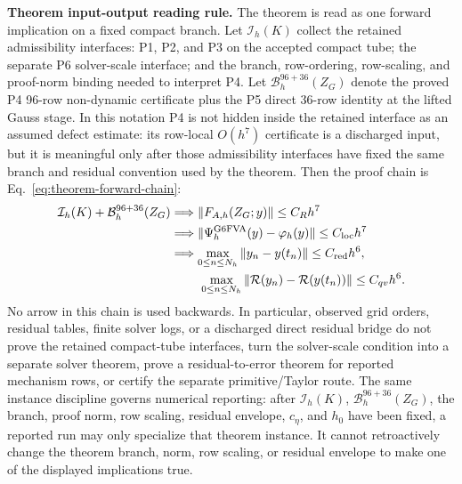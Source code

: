 \documentclass[preprint,12pt]{elsarticle}
\begin{document}
\noindent\textbf{Theorem input-output reading rule.}
The theorem is read as one forward implication on a fixed compact branch.  Let
\(\mathcal I_h(K)\) collect the retained admissibility interfaces: P1, P2,
and P3 on the accepted compact tube; the separate P6 solver-scale interface;
and the branch, row-ordering, row-scaling, and proof-norm binding needed to
interpret P4.  Let
\(\mathcal B_h^{96+36}(Z_G)\) denote the proved P4 96-row non-dynamic
certificate plus the P5 direct 36-row identity at the lifted Gauss stage.  In
this notation P4 is not hidden inside the retained interface as an assumed
defect estimate: its row-local \(O(h^7)\) certificate is a discharged input,
but it is meaningful only after those admissibility interfaces have
fixed the same branch and residual convention used by the theorem. Then the
proof chain is Eq.~\eqref{eq:theorem-forward-chain}:
\begin{equation}
\label{eq:theorem-forward-chain}
\begin{aligned}
\mathcal I_h(K)+\mathcal B_h^{96+36}(Z_G)
&\Longrightarrow
  \|F_{A,h}(Z_G;y)\|\le C_Rh^7\\
&\Longrightarrow
  \|\Psi_h^{\mathrm{G6FVA}}(y)-\varphi_h(y)\|\le C_{\rm loc}h^7\\
&\Longrightarrow
  \max_{0\le n\le N_h}\|y_n-y(t_n)\|\le C_{\rm red}h^6,\\
&\hspace{2.3em}
  \max_{0\le n\le N_h}\|\mathcal R(y_n)-\mathcal R(y(t_n))\|
  \le C_{qv}h^6 .
\end{aligned}
\end{equation}
No arrow in this chain is used backwards.  In particular, observed grid
orders, residual tables, finite solver logs, or a discharged direct residual bridge do
not prove the retained compact-tube interfaces, turn the solver-scale
condition into a separate solver theorem, prove a residual-to-error theorem
for reported mechanism rows, or certify the separate primitive/Taylor route.
The same instance discipline governs numerical reporting: after
\(\mathcal I_h(K)\), \(\mathcal B_h^{96+36}(Z_G)\), the branch, proof norm,
row scaling, residual envelope, \(c_\eta\), and \(h_0\) have been fixed, a
reported run may only specialize that theorem instance. It cannot
retroactively change the theorem branch, norm, row scaling, or residual
envelope to make one of the displayed implications true.
\end{document}
